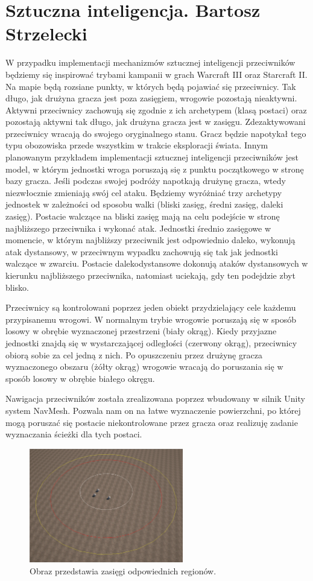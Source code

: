 \section{Sztuczna inteligencja. Bartosz Strzelecki}

W przypadku implementacji mechanizmów sztucznej inteligencji przeciwników będziemy się inspirować trybami kampanii w grach Warcraft III oraz Starcraft II. 
Na mapie będą rozsiane punkty, w których będą pojawiać się przeciwnicy. 
Tak długo, jak drużyna gracza jest poza zasięgiem, wrogowie pozostają nieaktywni. 
Aktywni przeciwnicy zachowują się zgodnie z ich archetypem (klasą postaci) oraz pozostają aktywni tak długo, jak drużyna gracza jest w zasięgu. 
Zdezaktywowani przeciwnicy wracają do swojego oryginalnego stanu. Gracz będzie napotykał tego typu obozowiska przede wszystkim w trakcie eksploracji świata. 
Innym planowanym przykładem implementacji sztucznej inteligencji przeciwników jest model, w którym jednostki wroga poruszają się z punktu początkowego w stronę bazy gracza. 
Jeśli podczas swojej podróży napotkają drużynę gracza, wtedy niezwłocznie zmieniają swój cel ataku.
Będziemy wyróżniać trzy archetypy jednostek w zależności od sposobu walki (bliski zasięg, średni zasięg, daleki zasięg). 
Postacie walczące na bliski zasięg mają na celu podejście w stronę najbliższego przeciwnika i wykonać atak. 
Jednostki średnio zasięgowe w momencie, w którym najbliższy przeciwnik jest odpowiednio daleko, wykonują atak dystansowy, 
w przeciwnym wypadku zachowują się tak jak jednostki walczące w zwarciu. 
Postacie  dalekodystansowe dokonują ataków dystansowych w kierunku najbliższego przeciwnika, natomiast uciekają, gdy ten podejdzie zbyt blisko.

Przeciwnicy są kontrolowani poprzez jeden obiekt przydzielający cele każdemu przypisanemu wrogowi. W normalnym trybie wrogowie poruszają się w sposób losowy
w obrębie wyznaczonej przestrzeni (biały okrąg). Kiedy przyjazne jednostki znajdą się w wystarczającej odległości (czerwony okrąg), przeciwnicy obiorą sobie za cel jedną z nich.
Po opuszczeniu przez drużynę gracza wyznaczonego obszaru (żółty okrąg) wrogowie wracają do poruszania się w sposób losowy w obrębie białego okręgu.

Nawigacja przeciwników została zrealizowana poprzez wbudowany w silnik Unity system NavMesh. Pozwala nam on na łatwe wyznaczenie powierzchni, po której mogą poruszać
się postacie niekontrolowane przez gracza oraz realizuję zadanie wyznaczania ścieżki dla tych postaci.

\begin{figure}[h]
\centering
\includegraphics[width=0.6\textwidth]{images/ai}
\caption{Obraz przedstawia zasięgi odpowiednich regionów.}
\label{fig:regions}
\end{figure}
